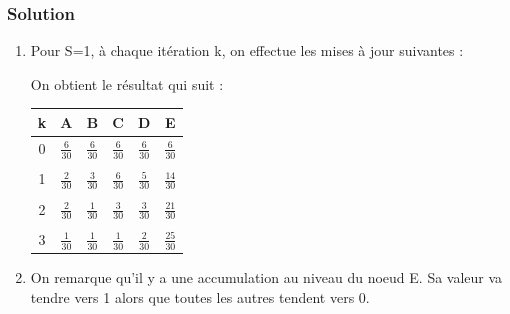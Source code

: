     \subsubsection*{Solution}
    \begin{enumerate}

    \item Pour S=1, à chaque itération k, on effectue les mises à jour suivantes :

    On obtient le résultat qui suit :
    \begin{center}
        \begin{tabular}{c|ccccc}
        k & A & B & C & D & E\\ \hline
    	0 & $\frac{6}{30}$ & $\frac{6}{30}$ & $\frac{6}{30}$ & $\frac{6}{30}$ & $\frac{6}{30}$\\ \\
    	1 & $\frac{2}{30}$ & $\frac{3}{30}$ & $\frac{6}{30}$ & $\frac{5}{30}$ & $\frac{14}{30}$\\ \\
    	2 & $\frac{2}{30}$ & $\frac{1}{30}$ & $\frac{3}{30}$ & $\frac{3}{30}$ & $\frac{21}{30}$\\ \\
    	3 & $\frac{1}{30}$ & $\frac{1}{30}$ & $\frac{1}{30}$ & $\frac{2}{30}$ & $\frac{25}{30}$\\
    	\end{tabular}
    \end{center}

    \item On remarque qu'il y a une accumulation au niveau du noeud E.
    Sa valeur va tendre vers 1 alors que toutes les autres tendent vers 0.


\end{enumerate}
